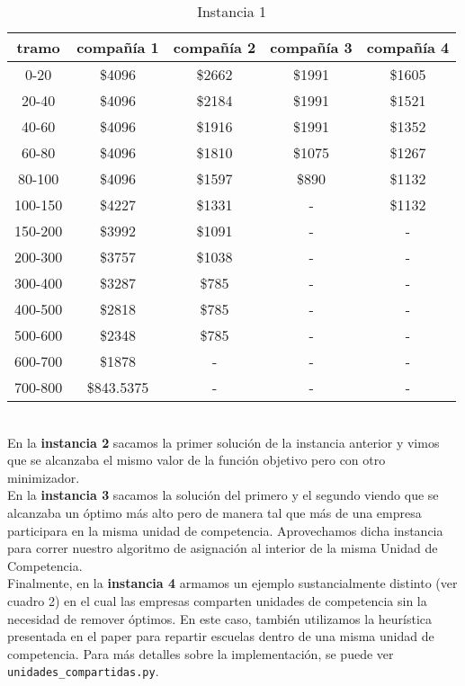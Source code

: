 \documentclass[12pt]{article}
\begin{document}
\begin{table}[h!]
\centering
\begin{tabular}{||c|| c | c | c | c||}  
 \hline
     tramo & compañía 1 & compañía 2 & compañía 3 & compañía 4 \\ [0.5ex] 
 \hline\hline
 0-20 & \$4096 & \$2662 & \$1991 & \$1605 \\ 
 20-40 & \$4096 & \$2184 & \$1991 & \$1521 \\
 40-60 & \$4096 & \$1916 & \$1991 & \$1352 \\
 60-80 & \$4096 & \$1810 & \$1075 & \$1267 \\
 80-100 & \$4096 & \$1597 & \$890 & \$1132 \\
 100-150 & \$4227 & \$1331 & \-- & \$1132 \\
 150-200 & \$3992 & \$1091 & \-- & \-- \\
 200-300 & \$3757 & \$1038 & \-- & \-- \\
 300-400 & \$3287 & \$785 & \-- & \-- \\
 400-500 & \$2818 & \$785 & \-- & \-- \\
 500-600 & \$2348 & \$785 & \-- & \-- \\
 600-700 & \$1878 & \-- & \-- & \-- \\
 700-800 & \$843.5375 & \-- & \-- & \-- \\ [1ex] 
 \hline
\end{tabular}
\caption{Instancia 1}
\label{table:1}
\end{table}

\\
En la \textbf{instancia 2} sacamos la primer solución de la instancia anterior y vimos que se alcanzaba el mismo valor de la función objetivo pero con otro minimizador.
\\
En la \textbf{instancia 3} sacamos la solución del primero y el segundo viendo que se alcanzaba un óptimo más alto pero de manera tal que más de una empresa participara en la misma unidad de competencia. Aprovechamos dicha instancia para correr nuestro algoritmo de asignación al interior de la misma Unidad de Competencia.
\\
Finalmente, en la \textbf{instancia 4} armamos un ejemplo sustancialmente distinto (ver cuadro 2) en el cual las empresas comparten unidades de competencia sin la necesidad de remover óptimos. En este caso, también utilizamos la heurística presentada en el paper para repartir escuelas dentro de una misma unidad de competencia. Para más detalles sobre la implementación, se puede ver \texttt{unidades\_compartidas.py}.
\end{document}
